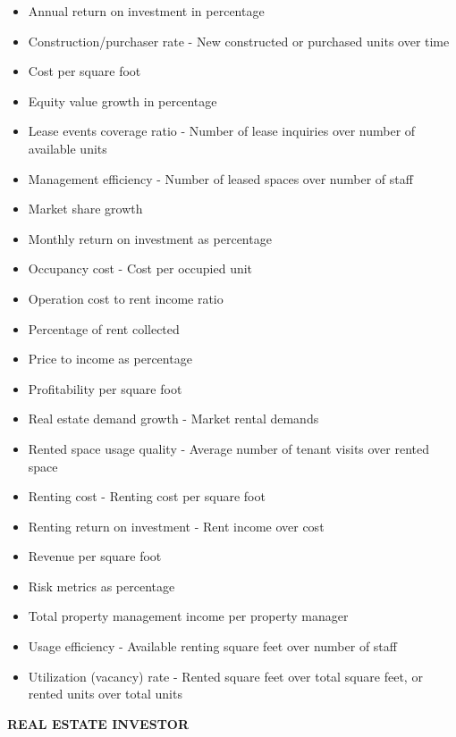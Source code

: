 \documentclass[]{book}
\providecommand{\tightlist}{%
  \setlength{\itemsep}{0pt}\setlength{\parskip}{0pt}}
\begin{document}
\begin{itemize}
\tightlist
\item
  Annual return on investment in percentage
\item
  Construction/purchaser rate - New constructed or purchased units over
  time
\item
  Cost per square foot
\item
  Equity value growth in percentage
\item
  Lease events coverage ratio - Number of lease inquiries over number of
  available units
\item
  Management efficiency - Number of leased spaces over number of staff
\item
  Market share growth
\item
  Monthly return on investment as percentage
\item
  Occupancy cost - Cost per occupied unit
\item
  Operation cost to rent income ratio
\item
  Percentage of rent collected
\item
  Price to income as percentage
\item
  Profitability per square foot
\item
  Real estate demand growth - Market rental demands
\item
  Rented space usage quality - Average number of tenant visits over
  rented space
\item
  Renting cost - Renting cost per square foot
\item
  Renting return on investment - Rent income over cost
\item
  Revenue per square foot
\item
  Risk metrics as percentage
\item
  Total property management income per property manager
\item
  Usage efficiency - Available renting square feet over number of staff
\item
  Utilization (vacancy) rate - Rented square feet over total square
  feet, or rented units over total units
\end{itemize}

\textbf{REAL ESTATE INVESTOR }
\end{document}
